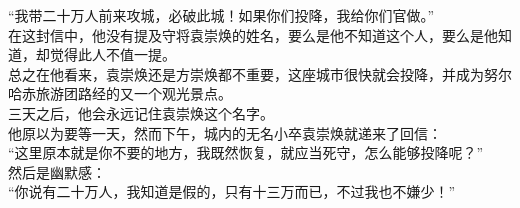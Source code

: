 \begin{multicols}{\theparacolNo}
“我带二十万人前来攻城，必破此城！如果你们投降，我给你们官做。”\\

在这封信中，他没有提及守将袁崇焕的姓名，要么是他不知道这个人，要么是他知道，却觉得此人不值一提。\\

总之在他看来，袁崇焕还是方崇焕都不重要，这座城市很快就会投降，并成为努尔哈赤旅游团路经的又一个观光景点。\\

三天之后，他会永远记住袁崇焕这个名字。\\

他原以为要等一天，然而下午，城内的无名小卒袁崇焕就递来了回信：\\

“这里原本就是你不要的地方，我既然恢复，就应当死守，怎么能够投降呢？”\\

然后是幽默感：\\

“你说有二十万人，我知道是假的，只有十三万而已，不过我也不嫌少！”\\

\ifnum{}
	\end{multicols}
\fi
\newpage
